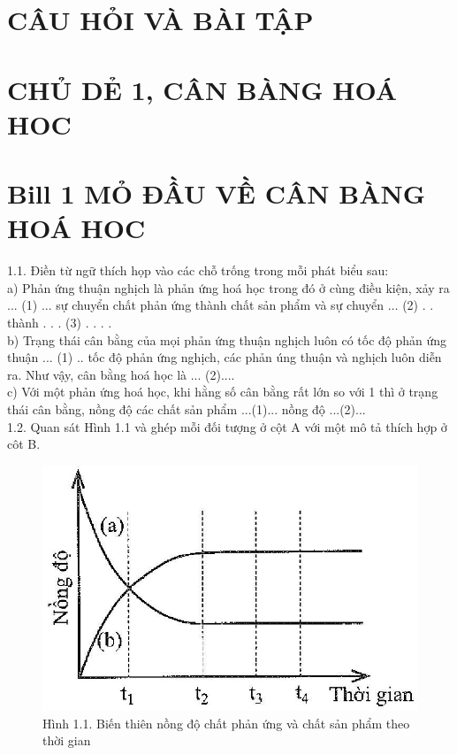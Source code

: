 \documentclass[10pt]{article}
\begin{document}
\captionsetup{singlelinecheck=false}
\section*{CÂU HỎI VÀ BÀI TẬP}
\section*{CHỦ DẺ 1, CÂN BÀNG HOÁ HOC}
\section*{Bill 1 MỎ ĐẦU VỀ CÂN BÀNG HOÁ HOC}
1.1. Điền từ ngữ thích họp vào các chỗ trống trong mỗi phát biểu sau:\\
a) Phản ứng thuận nghịch là phản ứng hoá học trong đó ở cùng điều kiện, xảy ra ... (1) ... sự chuyển chất phản ứng thành chất sản phẩm và sự chuyển $\ldots$ (2) . . thành . . . (3) . . . .\\
b) Trạng thái cân bằng của mọi phản ứng thuận nghịch luôn có tốc độ phản ứng thuận ... (1) .. tốc độ phản ứng nghịch, các phản úng thuận và nghịch luôn diễn ra. Như vậy, cân bằng hoá học là ... (2)....\\
c) Với một phản ứng hoá học, khi hằng số cân bằng rất lớn so với 1 thì ở trạng thái cân bằng, nồng độ các chất sản phẩm ...(1)... nồng độ ...(2)...\\
1.2. Quan sát Hình 1.1 và ghép mỗi đối tượng ở cột A với một mô tả thích hợp ở côt B.

\begin{figure}[h]
\begin{center}
  \includegraphics[width=\textwidth]{2025_10_23_f2823ef970776205e47bg-01}
\captionsetup{labelformat=empty}
\caption{Hình 1.1. Biến thiên nồng độ chất phản ứng và chất sản phẩm theo thời gian}
\end{center}
\end{figure}
\end{document}
